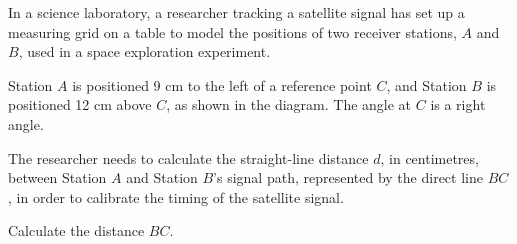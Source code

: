 \begin{question}
\noindent In a science laboratory, a researcher tracking a satellite signal has set up a measuring grid on a table to model the positions of two receiver stations, $A$ and $B$, used in a space exploration experiment.

\noindent Station $A$ is positioned 9 cm to the left of a reference point $C$, and Station $B$ is positioned 12 cm above $C$, as shown in the diagram. The angle at $C$ is a right angle.

\begin{center}
\end{center}

\noindent The researcher needs to calculate the straight-line distance $d$, in centimetres, between Station $A$ and Station $B$'s signal path, represented by the direct line $BC$, in order to calibrate the timing of the satellite signal.

\noindent Calculate the distance $BC$.
\vspace{4cm}
\begin{flushright}
\end{flushright}
\end{question}
